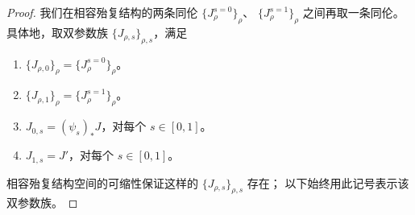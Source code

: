 \begin{proof}
我们在相容殆复结构的两条同伦
$\{J_\rho^{s=0}\}_\rho$、
$\{J_\rho^{s=1}\}_\rho$ 之间再取一条同伦。
具体地，取双参数族 $\{J_{\rho,s}\}_{\rho,s}$，满足
\begin{enumerate}[label=\textup{(4.6.26.\arabic*)},leftmargin=5.9em]
 \item
 $\{J_{\rho,0}\}_\rho=\{J_\rho^{s=0}\}_\rho$。
 \item
 $\{J_{\rho,1}\}_\rho=\{J_\rho^{s=1}\}_\rho$。
 \item
 $J_{0,s}=(\psi_s)_*J$，对每个 $s\in[0,1]$。
 \item
 $J_{1,s}=J'$，对每个 $s\in[0,1]$。
\end{enumerate}
相容殆复结构空间的可缩性保证这样的
$\{J_{\rho,s}\}_{\rho,s}$ 存在；
以下始终用此记号表示该双参数族。


\end{proof}

